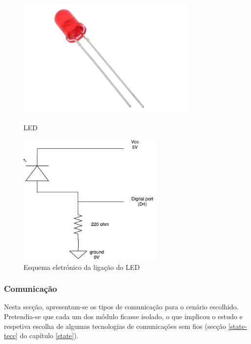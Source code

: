 \begin{figure}[h]
	\centering
	\begin{minipage}[b]{0.49\textwidth}
		\centering
		\includegraphics[width=0.8\textwidth]{img/hardware/led.jpg}
		\caption{\ac{LED}}
	\end{minipage}
	\hfill
	\begin{minipage}[b]{0.49\textwidth}
		\centering
		\includegraphics[width=0.65\textwidth]{img/hardware/led_esquema.pdf}
		\caption{Esquema eletrónico da ligação do \ac{LED}}
		\label{ligacao}
	\end{minipage}
\end{figure}

\subsubsection{Comunicação}

Nesta secção, apresentam-se os tipos de comunicação para o cenário escolhido. Pretendia-se que cada um dos módulo ficasse isolado, o que implicou o estudo e respetiva escolha de algumas tecnologias de comunicações sem fios (secção \ref{state-tecc} do capítulo \ref{state}). 

